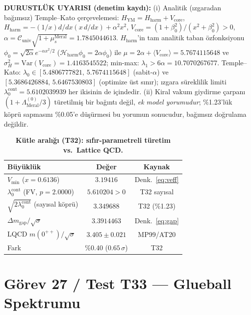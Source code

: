 \documentclass[12pt,a4paper]{article}
\begin{document}
\textbf{DURUSTLÜK UYARISI (denetim kaydı):} (i) Analitik (ızgaradan bağımsız)
Temple--Kato çerçevelemesi: $H_{\mathrm{YM}}=H_{\mathrm{harm}}+V_{\mathrm{core}}$,
$H_{\mathrm{harm}}=-(1/x)d/dx(x\,d/dx)+\alpha^2x^2$,
$V_{\mathrm{core}}=(1+\beta_0^2)/(x^2+\beta_0^2)>0$,
$\alpha=\mathcal{C}_{\mathrm{univ}}\sqrt{1+\mu_s^{\mathrm{Meral}}}=1.7845044613$.
$H_{\mathrm{harm}}$'in tam analitik taban özfonksiyonu
$\phi_0=\sqrt{2\alpha}e^{-\alpha x^2/2}$ ($\mathcal{H}_{\mathrm{harm}}\phi_0=
2\alpha\phi_0$) ile $\mu=2\alpha+\langle V_{\mathrm{core}}\rangle=
5.7674115648$ ve $\sigma_H^2=\mathrm{Var}(V_{\mathrm{core}})=1.4163545522$;
min-max: $\lambda_1>6\alpha=10.7070267677$. Temple--Kato:
$\lambda_0\in[5.4806777821,\,5.7674115648]$ (sabit-$\alpha$) ve
$[5.3686426884,\,5.6467530803]$ (optimize üst sınır); ızgara süreklilik
limiti $\lambda_0^{\mathrm{cont}}=5.6102039939$ her ikisinin de içindedir.
(ii) Kiral vakum giydirme çarpanı $(1+\Lambda_{\mathrm{Meral}}^{(0)}/3)$
türetilmiş bir bağıntı değil, \emph{ek model yorumudur}; \%1.23'lük köprü
sapmasını \%0.05'e düşürmesi bu yorumun sonucudur, bağımsız doğrulama
değildir.

\begin{table}[!htbp]
\centering\footnotesize
\setlength{\tabcolsep}{3pt}
\caption{\textbf{Kütle aralığı (T32): sıfır-parametreli türetim vs.\ Lattice QCD.}}
\label{tab:gap}
\vspace{0.1cm}
\begin{tabular}{@{}l|c|c@{}}
\toprule
Büyüklük & Değer & Kaynak \\
\midrule
$V_{\min}$ ($x=0.6136$) & $3.19416$ & Denk.~\ref{eq:veff} \\
$\lambda_0^{\mathrm{cont}}$ (FV, $p=2.0000$) & $5.610204>0$ & T32 sayısal \\
$\sqrt{2\lambda_0^{\mathrm{cont}}}$ (sayısal köprü) & $3.349688$ & T32 (\%1.23) \\
$\Delta m_{\mathrm{gap}}/\sqrt{\sigma}$ & $\mathbf{3.3914463}$ & Denk.~\ref{eq:gap} \\
LQCD $m(0^{++})/\sqrt{\sigma}$ & $3.405\pm 0.021$ & MP99/AT20 \\
Fark & \%0.40 ($0.65\,\sigma$) & T32 \\
\bottomrule
\end{tabular}
\end{table}

\section{Görev 27 / Test T33 --- Glueball Spektrumu}
\end{document}
